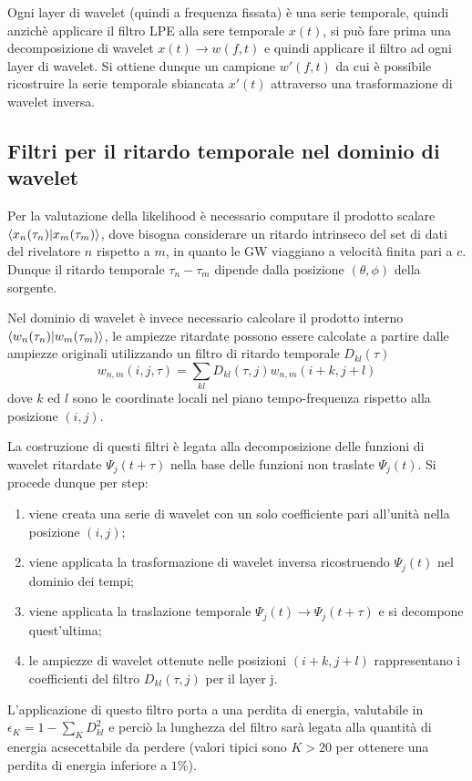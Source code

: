 Ogni layer di wavelet (quindi a frequenza fissata) è una serie temporale, quindi anzichè applicare il filtro LPE alla sere temporale $x(t)$, si può fare prima una decomposizione di wavelet $x(t)\rightarrow w(f,t)$ e quindi applicare il filtro ad ogni layer di wavelet. Si ottiene dunque un campione $w'(f, t)$ da cui è possibile ricostruire la serie temporale sbiancata $x'(t)$ attraverso una trasformazione di wavelet inversa\cite{Klimenko_2008}.
\subsection{Filtri per il ritardo temporale nel dominio di wavelet}
\label{subsection:time_delay_filters}
Per la valutazione della likelihood è necessario computare il prodotto scalare $\bra{x_n(\tau_n)}\ket{x_m(\tau_m)}$, dove bisogna considerare un ritardo intrinseco del set di dati del rivelatore $n$ rispetto a $m$, in quanto le GW viaggiano a velocità finita pari a $c$. Dunque il ritardo temporale $\tau_n - \tau_m$ dipende dalla posizione $(\theta, \phi)$ della sorgente.

Nel dominio di wavelet è invece necessario calcolare il prodotto interno $\bra{w_n(\tau_n)}\ket{w_m(\tau_m)}$, le ampiezze ritardate possono essere calcolate a partire dalle ampiezze originali utilizzando un filtro di ritardo temporale $D_{kl}(\tau)$
\begin{equation}
	w_{n,m}(i,j,\tau) = \sum_{kl}D_{kl}(\tau, j)w_{n,m}(i+k, j+l)
	\label{eqn:time_filter}
\end{equation}
dove $k$ ed $l$ sono le coordinate locali nel piano tempo-frequenza rispetto alla posizione $(i,j)$.

La costruzione di questi filtri è legata alla decomposizione delle funzioni di wavelet ritardate $\Psi_j(t+\tau)$ nella base delle funzioni non traslate $\Psi_j(t)$. Si procede dunque per step:
\begin{enumerate}
	\item viene creata una serie di wavelet con un solo coefficiente pari all'unità nella posizione $(i,j)$;
	\item viene applicata la trasformazione di wavelet inversa ricostruendo $\Psi_j(t)$ nel dominio dei tempi;
	\item viene applicata la traslazione temporale $\Psi_j(t)\rightarrow\Psi_j(t+\tau)$ e si decompone quest'ultima;
	\item le ampiezze di wavelet ottenute nelle posizioni $(i+k, j+l)$ rappresentano i coefficienti del filtro $D_{kl}(\tau, j)$ per il layer j.
\end{enumerate}
L'applicazione di questo filtro porta a una perdita di energia, valutabile in $\epsilon_K = 1 - \sum_{K}D_{kl}^2$
e perciò la lunghezza del filtro sarà legata alla quantità di energia acsecettabile da perdere (valori tipici sono $K>20$ per ottenere una perdita di energia inferiore a $1\%$)\cite{Klimenko_2008}.

